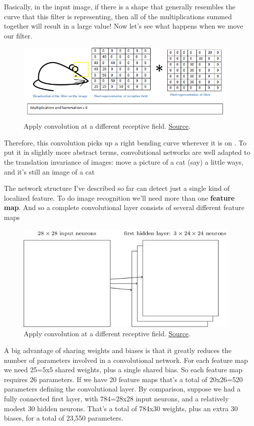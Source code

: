 \documentclass[a4paper]{tufte-handout}
\begin{document}
Basically, in the input image, if there is a shape that generally
resembles the curve that this filter is representing, then all of the
multiplications summed together will result in a large value! Now let's
see what happens when we move our filter.

\begin{figure}
\includegraphics[width=110mm]{conv_example4.png}
\caption{Apply convolution at a different receptive field.
\href{https://adeshpande3.github.io/adeshpande3.github.io/A-Beginner's-Guide-To-Understanding-Convolutional-Neural-Networks/}{Source}.
}
\end{figure}

Therefore, this convolution picks up a right bending curve wherever it
is on . To put it in slightly more abstract terms, convolutional
networks are well adapted to the translation invariance of images: move
a picture of a cat (say) a little ways, and it's still an image of a cat

The network structure I've described so far can detect just a single
kind of localized feature. To do image recognition we'll need more than
one \textbf{feature map}. And so a complete convolutional layer consists
of several different feature maps

\begin{figure}
\includegraphics[width=110mm]{conv4.png}
\caption{Apply convolution at a different receptive field.
\href{http://neuralnetworksanddeeplearning.com/chap6.html}{Source}.
}
\end{figure}

A big advantage of sharing weights and biases is that it greatly reduces
the number of parameters involved in a convolutional network. For each
feature map we need 25=5x5 shared weights, plus a single shared bias. So
each feature map requires 26 parameters. If we have 20 feature maps
that's a total of 20x26=520 parameters defining the convolutional layer.
By comparison, suppose we had a fully connected first layer, with
784=28x28 input neurons, and a relatively modest 30 hidden neurons.
That's a total of 784x30 weights, plus an extra 30 biases, for a total
of 23,550 parameters.
\end{document}
